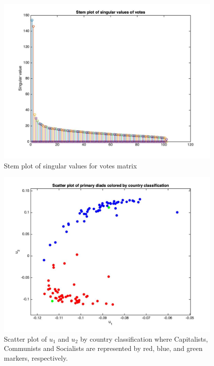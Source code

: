 \documentclass[12pt]{exam}
\begin{document}
\begin{questions}
\begin{verbatim}
  \end{verbatim}

  \begin{figure}[hpb!]
    \centering
    \includegraphics[scale=0.3]{final_data/stem_plot.jpg}
    \caption{Stem plot of singular values for votes matrix}
    \label{fig:step_plot}
  \end{figure}

  \begin{figure}[hpb!]
    \centering
    \includegraphics[scale=0.3]{final_data/country_scatter_classification.jpg}
    \caption{Scatter plot of $u_1$ and $u_2$ by country classification where Capitalists, Communists and Socialists are represented by red, blue, and green markers, respectively.}
    \label{fig:scatter_plot_by_country}
  \end{figure}


\end{questions}
\end{document}
